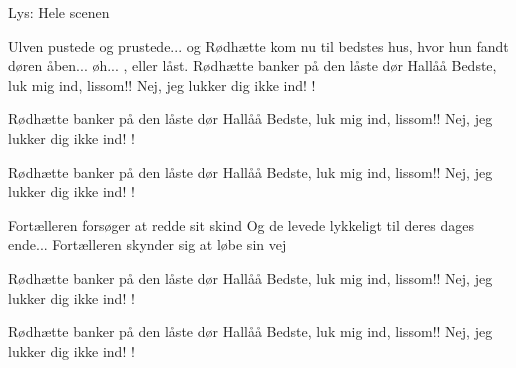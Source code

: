 \documentclass[a4paper,11pt]{article}
\begin{document}
\begin{sketch}
\scene Lys: Hele scenen

 Ulven pustede og prustede... og Rødhætte kom nu til bedstes hus, hvor hun fandt døren åben... øh... , eller låst.
\scene Rødhætte banker på den låste dør
 Hallåå Bedste, luk mig ind, lissom!!
 Nej, jeg lukker dig ikke ind!
  !

\scene Rødhætte banker på den låste dør
 Hallåå Bedste, luk mig ind, lissom!!
 Nej, jeg lukker dig ikke ind!
  !

\scene Rødhætte banker på den låste dør
 Hallåå Bedste, luk mig ind, lissom!!
 Nej, jeg lukker dig ikke ind!
  !

\scene Fortælleren forsøger at redde sit skind
 Og de levede lykkeligt til deres dages ende...
\scene Fortælleren skynder sig at løbe sin vej

\scene Rødhætte banker på den låste dør
 Hallåå Bedste, luk mig ind, lissom!!
 Nej, jeg lukker dig ikke ind!
  !

\scene Rødhætte banker på den låste dør
 Hallåå Bedste, luk mig ind, lissom!!
 Nej, jeg lukker dig ikke ind!
  !

\end{sketch}
\end{document}
